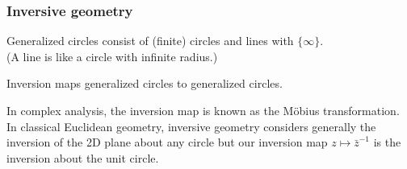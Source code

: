 \documentclass[10pt,mathserif]{beamer}
\begin{document}
\begin{frame}
\frametitle{Inversive geometry}
 Generalized circles consist of (finite) circles and lines with $\{\infty\}$. \\
 (A line is like a circle with infinite radius.)
 
 \vspace{0.2in}
 Inversion maps generalized circles to generalized circles.
 
 \vspace{0.2in}

In complex analysis, the inversion map is known as the M\"obius transformation.
 In classical Euclidean geometry, inversive geometry considers generally the inversion of the 2D plane about any circle but our inversion map $z\mapsto\bar{z}^{-1}$ is the inversion about the unit circle.

\end{frame}
\end{document}
